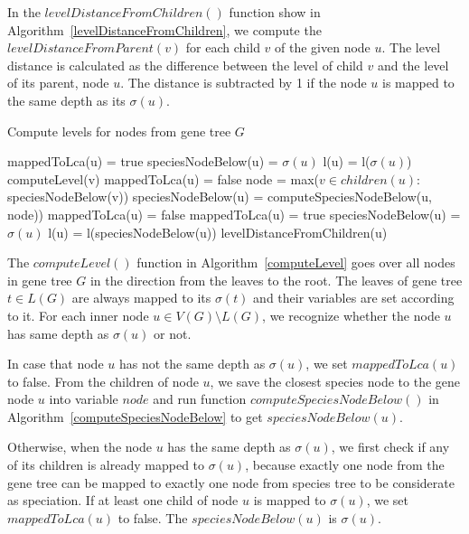 In the $levelDistanceFromChildren()$ function show in Algorithm~\ref{levelDistanceFromChildren}, we compute the $levelDistanceFromParent(v)$ for each child $v$ of the given node $u$. The level distance is calculated as the difference between the level of child $v$ and the level of its parent, node $u$. The distance is subtracted by 1 if the node $u$ is mapped to the same depth as its $\sigma(u)$.

\begin{algorithm}
\caption{Compute levels for nodes from gene tree $G$} 
\label{computeLevel}
\begin{algorithmic}[1]
		\State mappedToLca(u) = true
		\State speciesNodeBelow(u) = $\sigma(u)$
		\State l(u) = l($\sigma(u)$)
	\Else
			\State computeLevel(v)
		\EndFor
			\State mappedToLca(u) = false
			\State node = max($v \in children(u)$: speciesNodeBelow(v))
			\State speciesNodeBelow(u) = computeSpeciesNodeBelow(u, node))
		\Else
				\State mappedToLca(u) = false
			\Else
				\State mappedToLca(u) = true
			\EndIf
			\State speciesNodeBelow(u) = $\sigma(u)$
		\EndIf
		\State l(u) = l(speciesNodeBelow(u))
		\State levelDistanceFromChildren(u)
	\EndIf
\EndFunction
\end{algorithmic}
\end{algorithm}

The $computeLevel()$ function in Algorithm~\ref{computeLevel} goes over all nodes in gene tree $G$ in the direction from the leaves to the root. The leaves of gene tree $t \in L(G)$ are always mapped to its $\sigma(t)$ and their variables are set according to it. For each inner node $u \in V(G) \setminus L(G)$, we recognize whether the node $u$ has same depth as $\sigma(u)$ or not.

In case that node $u$ has not the same depth as $\sigma(u)$, we set $mappedToLca(u)$ to false. From the children of node $u$, we save the closest species node to the gene node $u$ into variable $node$ and run function $computeSpeciesNodeBelow()$ in Algorithm~\ref{computeSpeciesNodeBelow} to get $speciesNodeBelow(u)$. 

Otherwise, when the node $u$ has the same depth as $\sigma(u)$, we first check if any of its children is already mapped to $\sigma(u)$, because exactly one node from the gene tree can be mapped to exactly one node from species tree to be considerate as speciation. If at least one child of node $u$ is mapped to $\sigma(u)$, we set $mappedToLca(u)$ to false. The $speciesNodeBelow(u)$ is $\sigma(u)$.

